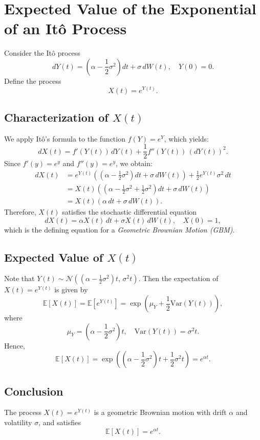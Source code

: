 \section{Expected Value of the Exponential of an Itô Process}

Consider the Itô process
\[
dY(t) = \left( \alpha - \frac{1}{2} \sigma^2 \right) dt + \sigma\, dW(t), \quad Y(0) = 0.
\]
Define the process
\[
X(t) = e^{Y(t)}.
\]

\subsection*{Characterization of \( X(t) \)}
We apply Itô's formula to the function \( f(Y) = e^Y \), which yields:
\[
dX(t) = f'(Y(t))\, dY(t) + \frac{1}{2} f''(Y(t))\, (dY(t))^2.
\]
Since \( f'(y) = e^y \) and \( f''(y) = e^y \), we obtain:
\[
\begin{aligned}
dX(t) &= e^{Y(t)} \left( \left( \alpha - \frac{1}{2} \sigma^2 \right) dt + \sigma\, dW(t) \right) + \frac{1}{2} e^{Y(t)} \sigma^2\, dt \\
&= X(t) \left( \left( \alpha - \frac{1}{2} \sigma^2 + \frac{1}{2} \sigma^2 \right) dt + \sigma\, dW(t) \right) \\
&= X(t) \left( \alpha\, dt + \sigma\, dW(t) \right).
\end{aligned}
\]
Therefore, \( X(t) \) satisfies the stochastic differential equation
\[
dX(t) = \alpha X(t)\, dt + \sigma X(t)\, dW(t), \quad X(0) = 1,
\]
which is the defining equation for a \emph{Geometric Brownian Motion (GBM)}.

\subsection*{Expected Value of \( X(t) \)}
Note that \( Y(t) \sim \mathcal{N}\left( \left( \alpha - \frac{1}{2} \sigma^2 \right)t,\, \sigma^2 t \right) \). Then the expectation of \( X(t) = e^{Y(t)} \) is given by
\[
\mathbb{E}[X(t)] = \mathbb{E}[e^{Y(t)}] = \exp\left( \mu_Y + \frac{1}{2} \text{Var}(Y(t)) \right),
\]
where
\[
\mu_Y = \left( \alpha - \frac{1}{2} \sigma^2 \right)t, \quad \text{Var}(Y(t)) = \sigma^2 t.
\]
Hence,
\[
\mathbb{E}[X(t)] = \exp\left( \left( \alpha - \frac{1}{2} \sigma^2 \right)t + \frac{1}{2} \sigma^2 t \right) = e^{\alpha t}.
\]

\subsection*{Conclusion}
The process \( X(t) = e^{Y(t)} \) is a geometric Brownian motion with drift \( \alpha \) and volatility \( \sigma \), and satisfies
\[
\mathbb{E}[X(t)] = e^{\alpha t}.
\]